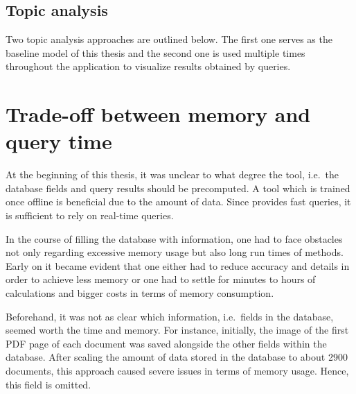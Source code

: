 







\subsection{Topic analysis}\label{impl-topic-modeling}

Two topic analysis approaches are outlined below.
The first one serves as the baseline model of this thesis and 
the second one is used multiple times throughout the application to visualize results obtained by queries.










\section{Trade-off between memory and query time}\label{sec:trade-off}

At the beginning of this thesis, it was unclear to what degree the tool, 
i.e.\ the database fields and query results should be precomputed.
A tool which is trained once offline is beneficial due to the amount of data.
Since \databaseName{} provides fast queries, it is sufficient to rely on real-time queries.

In the course of filling the database with information, 
one had to face obstacles not only regarding excessive memory usage but also long run times of methods.
Early on it became evident that one either had to reduce accuracy and details in order to achieve less memory or 
one had to settle for minutes to hours of calculations and bigger costs in terms of memory consumption.

Beforehand, it was not as clear which information, i.e.\ fields in the database, seemed worth the time and memory.
For instance, initially, the image of the first PDF page of each document was saved alongside the other fields within the database.
After scaling the amount of data stored in the database to about 2900 documents, 
this approach caused severe issues in terms of memory usage.
Hence, this field is omitted.